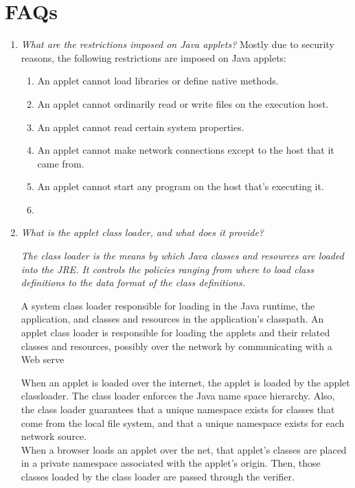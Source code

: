 \documentclass[11pt]{article}
\begin{document}

\section{FAQs}
\begin{enumerate}
	\item \textit{What are the restrictions imposed on Java applets?}
	      Mostly due to security reasons, the following restrictions are imposed on Java applets:

	      \begin{enumerate}
		      \item An applet cannot load libraries or define native methods.
		      \item An applet cannot ordinarily read or write files on the execution host.
		      \item An applet cannot read certain system properties.
		      \item An applet cannot make network connections except to the host that it came from.
		      \item An applet cannot start any program on the host that's executing it.
		      \item
	      \end{enumerate}
	\item \textit{What is the applet class loader, and what does it provide?}

	      \textit{The class loader is the means by which Java classes and resources are loaded into the JRE. It controls the policies ranging from where to load class definitions to the data format of the class definitions.}

	      A system class loader responsible for loading in the Java runtime, the application, and classes and resources in the application's classpath. An applet class loader is responsible for loading the applets and their related classes and resources, possibly over the network by communicating with a Web serve

	      When an applet is loaded over the internet, the applet is loaded by the applet classloader. The class loader enforces the Java name space hierarchy. Also, the class loader guarantees that a unique namespace exists for classes that come from the local file system, and that a unique namespace exists for each network source.\\

	      When a browser loads an applet over the net, that applet's classes are placed in a private namespace associated with the applet's origin. Then, those classes loaded by the class loader are passed through the verifier.


\end{enumerate}
\end{document}
